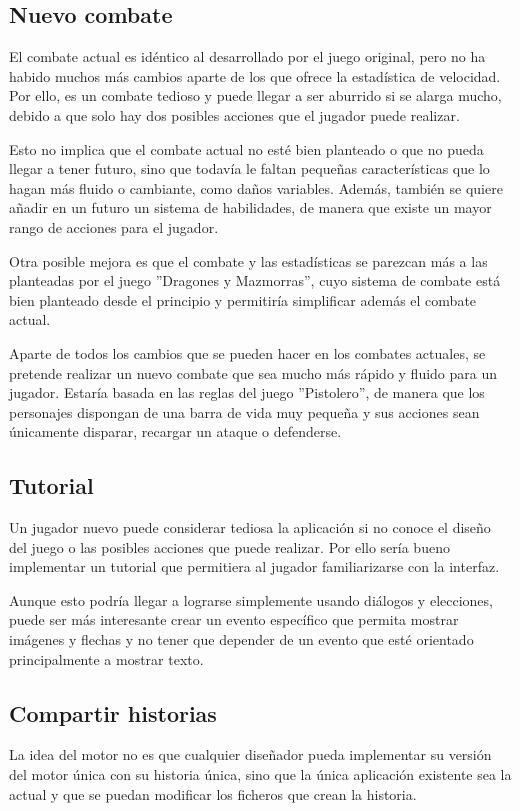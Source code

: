 \subsection{Nuevo combate}
El combate actual es idéntico al desarrollado por el juego original, pero no ha habido muchos más cambios aparte de los que ofrece la estadística de velocidad. Por ello, es un combate tedioso y puede llegar a ser aburrido si se alarga mucho, debido a que solo hay dos posibles acciones que el jugador puede realizar.

Esto no implica que el combate actual no esté bien planteado o que no pueda llegar a tener futuro, sino que todavía le faltan pequeñas características que lo hagan más fluido o cambiante, como daños variables.
Además, también se quiere añadir en un futuro un sistema de habilidades, de manera que existe un mayor rango de acciones para el jugador.

Otra posible mejora es que el combate y las estadísticas se parezcan más a las planteadas por el juego ''Dragones y Mazmorras'', cuyo sistema de combate está bien planteado desde el principio y permitiría simplificar además el combate actual.

Aparte de todos los cambios que se pueden hacer en los combates actuales, se pretende realizar un nuevo combate que sea mucho más rápido y fluido para un jugador. Estaría basada en las reglas del juego ''Pistolero'', de manera que los personajes dispongan de una barra de vida muy pequeña y sus acciones sean únicamente disparar, recargar un ataque o defenderse.

\subsection{Tutorial}
Un jugador nuevo puede considerar tediosa la aplicación si no conoce el diseño del juego o las posibles acciones que puede realizar. Por ello sería bueno implementar un tutorial que permitiera al jugador familiarizarse con la interfaz.

Aunque esto podría llegar a lograrse simplemente usando diálogos y elecciones, puede ser más interesante crear un evento específico que permita mostrar imágenes y flechas y no tener que depender de un evento que esté orientado principalmente a mostrar texto.
 
\subsection{Compartir historias}
La idea del motor no es que cualquier diseñador pueda implementar su versión del motor única con su historia única, sino que la única aplicación existente sea la actual y que se puedan modificar los ficheros que crean la historia.

